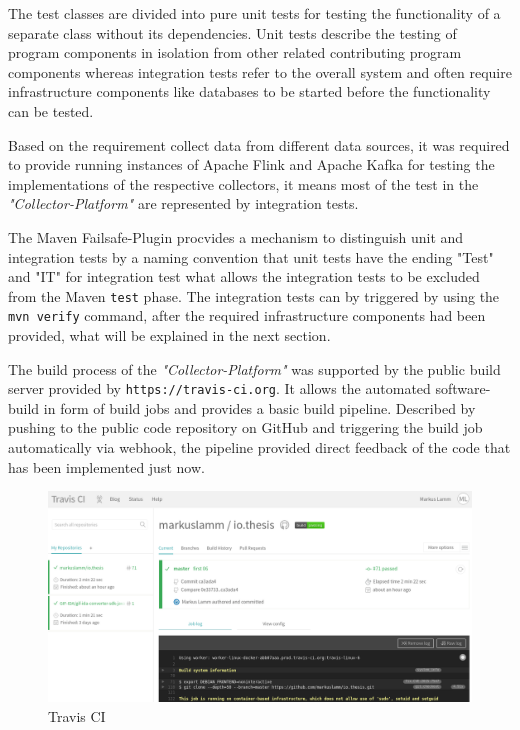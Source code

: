 The test classes are divided into pure unit tests for testing the functionality of a separate class without its dependencies.
Unit tests describe the testing of program components in isolation from other related contributing program components whereas
integration tests refer to the overall system and often require infrastructure components like databases to be started before
the functionality can be tested.

Based on the requirement collect data from different data sources, it was required to provide running instances of Apache Flink and Apache Kafka
for testing the implementations of the respective collectors, it means most of the test in the \textit{"Collector-Platform"} are represented by
integration tests.

The Maven Failsafe-Plugin procvides a mechanism to distinguish unit and integration tests by a naming convention that unit tests
have the ending "Test" and "IT" for integration test what allows the integration tests to be excluded from the Maven \verb|test|
phase. The integration tests can by triggered by using the \verb|mvn verify| command, after the required infrastructure components
had been provided, what will be explained in the next section.

The build process of the \textit{"Collector-Platform"} was supported by the public build server provided by \verb|https://travis-ci.org|.
It allows the automated software-build in form of build jobs and provides a basic build pipeline. Described by pushing to the public code
repository on GitHub and triggering the build job automatically via webhook, the pipeline provided direct feedback of the code that has been
implemented just now.
\begin{figure}[H]
	\centering
	\includegraphics[width=1.0\textwidth]{../images/07-travis.png}
	\caption{Travis CI}
	\label{fig:travis}
\end{figure}

